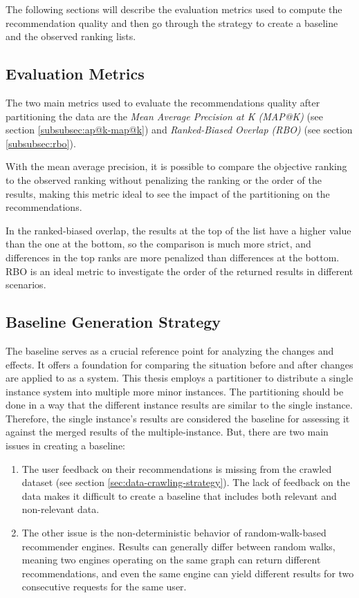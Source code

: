 The following sections will describe the evaluation metrics used to compute the recommendation quality and then go through the strategy to create a baseline and the observed ranking lists.

\subsection{Evaluation Metrics}
\label{subsec:evaluation-metrics-for-recommendation-quality}
The two main metrics used to evaluate the recommendations quality after partitioning the data are the \emph{Mean Average Precision at K (MAP@K)} (see section \ref{subsubsec:ap@k-map@k})  and \emph{Ranked-Biased Overlap (RBO)} (see section \ref{subsubsec:rbo}). 


With the mean average precision, it is possible to compare the objective ranking to the observed ranking without penalizing the ranking or the order of the results, making this metric ideal to see the impact of the partitioning on the recommendations.


In the ranked-biased overlap, the results at the top of the list have a higher value than the one at the bottom, so the comparison is much more strict, and differences in the top ranks are more penalized than differences at the bottom. RBO is an ideal metric to investigate the order of the returned results in different scenarios.


\subsection{Baseline Generation Strategy}
\label{subsec:baseline-generation}
The baseline serves as a crucial reference point for analyzing the changes and effects. It offers a foundation for comparing the situation before and after changes are applied to as a system. This thesis employs a partitioner to distribute a single instance system into multiple more minor instances. The partitioning should be done in a way that the different instance results are similar to the single instance. Therefore, the single instance's results are considered the baseline for assessing it against the merged results of the multiple-instance. But, there are two main issues in creating a baseline:

\begin{enumerate}
    \item The user feedback on their recommendations is missing from the crawled dataset (see section \ref{sec:data-crawling-strategy}). The lack of feedback on the data makes it difficult to create a baseline that includes both relevant and non-relevant data.
    
    \item The other issue is the non-deterministic behavior of random-walk-based recommender engines. Results can generally differ between random walks, meaning two engines operating on the same graph can return different recommendations, and even the same engine can yield different results for two consecutive requests for the same user.
\end{enumerate}

